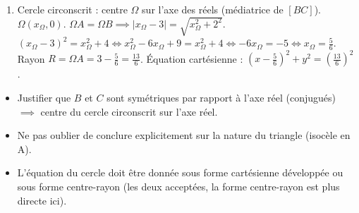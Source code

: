 \documentclass[11pt]{article}
\begin{document}
\begin{corrige}
\begin{enumerate}
\item Cercle circonscrit : centre $\Omega$ sur l'axe des réels (médiatrice de $[BC]$).
$\Omega(x_\Omega, 0)$. $\Omega A = \Omega B \implies |x_\Omega - 3| = \sqrt{x_\Omega^2 + 2^2}$.
$(x_\Omega - 3)^2 = x_\Omega^2 + 4 \iff x_\Omega^2 - 6x_\Omega + 9 = x_\Omega^2 + 4 \iff -6x_\Omega = -5 \iff x_\Omega = \frac{5}{6}$.
Rayon $R = \Omega A = 3 - \frac{5}{6} = \frac{13}{6}$.
Équation cartésienne : $\boxed{\left(x - \frac{5}{6}\right)^2 + y^2 = \left(\frac{13}{6}\right)^2}$.
\end{enumerate}
\begin{attention}
\begin{itemize}
\item Justifier que $B$ et $C$ sont symétriques par rapport à l'axe réel (conjugués) $\implies$ centre du cercle circonscrit sur l'axe réel.
\item Ne pas oublier de conclure explicitement sur la nature du triangle (isocèle en A).
\item L'équation du cercle doit être donnée sous forme cartésienne développée ou sous forme centre-rayon (les deux acceptées, la forme centre-rayon est plus directe ici).
\end{itemize}
\end{attention}
\end{corrige}
\end{document}
